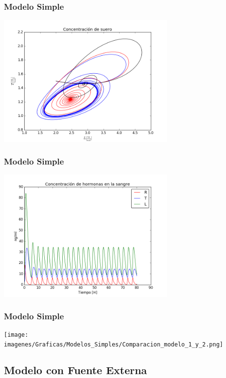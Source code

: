 \documentclass[10pt]{beamer}
\begin{document}
\begin{frame}
\frametitle{Modelo Simple}
\begin{center}
 \includegraphics[width=3.5in]{imagenes/Graficas/Modelos_Simples/g4_2D.png}
\end{center}
\end{frame}

\begin{frame}
\frametitle{Modelo Simple}
\begin{center}
 \includegraphics[width=3.5in]{imagenes/Graficas/Modelos_Simples/g5_g2-modelo2.png}
\end{center}
\end{frame}

\begin{frame}
\frametitle{Modelo Simple}
\begin{center}
 \texttt{[image: imagenes/Graficas/Modelos\_Simples/Comparacion\_modelo\_1\_y\_2.png]}
\end{center}
\end{frame}

\subsection{Modelo con Fuente Externa}
\end{document}
